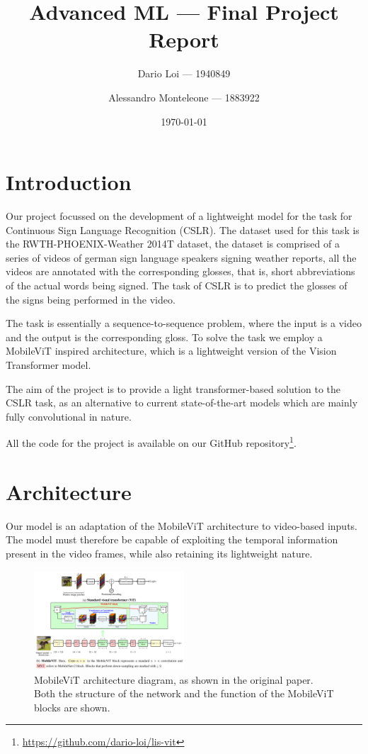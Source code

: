 \documentclass{IEEEtran}
\author{Dario Loi --- 1940849 \\ \and Alessandro Monteleone --- 1883922}
\title{Advanced ML --- Final Project Report}
\date{\today}
\begin{document}
\lstset{language=Python}

\maketitle
\tableofcontents

\section{Introduction}

Our project focussed on the development of a lightweight model for the task for Continuous 
Sign Language Recognition (CSLR). The dataset used for this task is the RWTH-PHOENIX-Weather 2014T dataset\cite{forster_rwth-phoenix-weather_2012},
the dataset is comprised of a series of videos of german sign language speakers signing weather reports, all the videos are annotated with the 
corresponding glosses, that is, short abbreviations of the actual words being signed. The task of CSLR is to predict the glosses of the signs being performed in the video.

The task is essentially a sequence-to-sequence problem, where the input is a video and the output is the corresponding gloss. To solve the task we 
employ a MobileViT\cite{mehta_mobilevit_2022} inspired architecture, which is a lightweight version of the Vision Transformer\cite{dosovitskiy_image_2021} model. 

The aim of the project is to provide a light transformer-based solution to the CSLR task, as an alternative to current state-of-the-art models which are
mainly fully convolutional\cite{ahn_slowfast_2023,hu_continuous_2023} in nature. 

All the code for the project is available on our GitHub repository\footnote{\url{https://github.com/dario-loi/lis-vit}}.
\section{Architecture}

Our model is an adaptation of the MobileViT architecture\cite{mehta_mobilevit_2022} to video-based inputs. The model must therefore be capable 
of exploiting the temporal information present in the video frames, while also retaining its lightweight nature.

\begin{figure}[h]
    \centering
    \includegraphics[width=0.5\textwidth]{figures/arch.png}
    \caption{MobileViT\cite{mehta_mobilevit_2022} architecture diagram, as shown in the original paper. Both the structure of the network and the function of the MobileViT blocks are shown.}
    \label{fig:mobilevit}
\end{figure}
\end{document}
